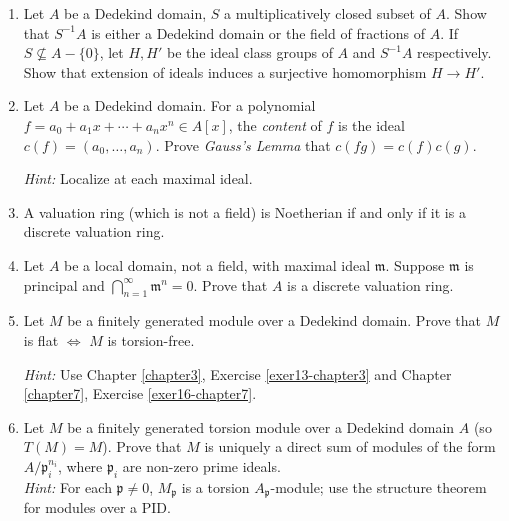 
\begin{enumerate}
    \item \label{exer1-chapter9}Let $A$ be a Dedekind domain, $S$ a multiplicatively closed subset of $A$. Show that $S^{-1}A$ is either a Dedekind domain or the field of fractions of $A$. If $S \not\subseteq A - \{0\}$, let $H, H'$ be the ideal class groups of $A$ and $S^{-1}A$ respectively. Show that extension of ideals induces a surjective homomorphism $H \to H'$.

    \item \label{exer2-chapter9}Let $A$ be a Dedekind domain. For a polynomial $f = a_0 + a_1 x + \cdots + a_n x^n \in A[x]$, the \emph{content} of $f$ is the ideal $c(f) = (a_0, \ldots, a_n)$. Prove \emph{Gauss's Lemma} that $c(fg) = c(f)c(g)$.
    
    \textit{Hint:} Localize at each maximal ideal.

    \item \label{exer3-chapter9}A valuation ring (which is not a field) is Noetherian if and only if it is a discrete valuation ring.

    \item \label{exer4-chapter9}Let $A$ be a local domain, not a field, with maximal ideal $\mathfrak{m}$. Suppose $\mathfrak{m}$ is principal and $\bigcap_{n=1}^\infty \mathfrak{m}^n = 0$. Prove that $A$ is a discrete valuation ring.

    \item \label{exer5-chapter9}Let $M$ be a finitely generated module over a Dedekind domain. Prove that $M$ is flat $\iff$ $M$ is torsion-free.
    
    \textit{Hint:} Use Chapter \ref{chapter3}, Exercise \ref{exer13-chapter3} and Chapter \ref{chapter7}, Exercise \ref{exer16-chapter7}.

    \item \label{exer6-chapter9}Let $M$ be a finitely generated torsion module over a Dedekind domain $A$ (so $T(M) = M$). Prove that $M$ is uniquely a direct sum of modules of the form $A/\mathfrak{p}_i^{n_i}$, where $\mathfrak{p}_i$ are non-zero prime ideals.\\
    \textit{Hint:} For each $\mathfrak{p} \neq 0$, $M_\mathfrak{p}$ is a torsion $A_\mathfrak{p}$-module; use the structure theorem for modules over a PID.


\end{enumerate}
